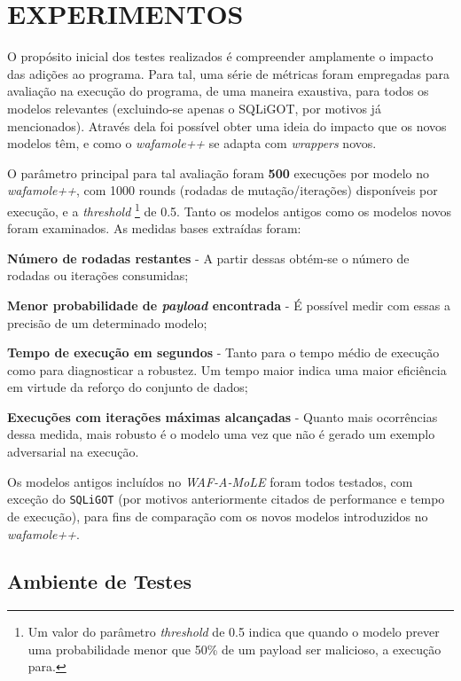 \chapter{EXPERIMENTOS}
\label{chp:capitulo5}

O propósito inicial dos testes realizados é compreender amplamente o impacto das adições ao programa. Para tal, uma série de métricas foram empregadas para avaliação na execução do programa, de uma maneira exaustiva, para todos os modelos relevantes (excluindo-se apenas o SQLiGOT, por motivos já mencionados). Através dela foi possível obter uma ideia do impacto que os novos modelos têm, e como o \textit{wafamole++} se adapta com \textit{wrappers} novos.

O parâmetro principal para tal avaliação foram \textbf{500} execuções por modelo no \textit{wafamole++}, com 1000 rounds (rodadas de mutação/iterações) disponíveis por execução, e a \textit{threshold} \footnote{Um valor do parâmetro \textit{threshold} de 0.5 indica que quando o modelo prever uma probabilidade menor que 50\% de um payload ser malicioso, a execução para.} de 0.5. Tanto os modelos antigos como os modelos novos foram examinados. As medidas bases extraídas foram:
\begin{alineas}
\item \textbf{Número de rodadas restantes} - A partir dessas obtém-se o número de rodadas ou iterações consumidas;
\item \textbf{Menor probabilidade de \textit{payload} encontrada} - É possível medir com essas a precisão de um determinado modelo;
\item \textbf{Tempo de execução em segundos} - Tanto para o tempo médio de execução como para diagnosticar a robustez. Um tempo maior indica uma maior eficiência em virtude da reforço do conjunto de dados;
\item \textbf{Execuções com iterações máximas alcançadas} - Quanto mais ocorrências dessa medida, mais robusto é o modelo uma vez que não é gerado um exemplo adversarial na execução.
\end{alineas}

Os modelos antigos incluídos no \textit{WAF-A-MoLE} foram todos testados, com exceção do \verb+SQLiGOT+ (por motivos anteriormente citados de performance e tempo de execução), para fins de comparação com os novos modelos introduzidos no \textit{wafamole++}.

\section{Ambiente de Testes}

